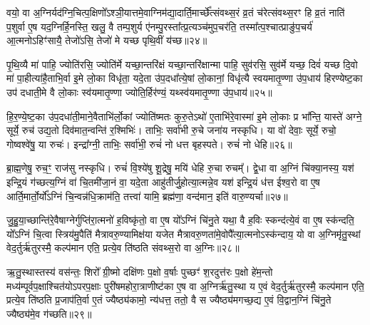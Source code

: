 {\anuvakamend[{तम॑सा\-ऽ\-ऽदि॒त्यो᳚\-ऽस्तीति॒ दिश॑ आदि॒त्यः प्र॒जाप॑तिमब्रवी॒दुप॑ त्वा॒\-ऽसौ पञ्च॑चत्वारिꣳशच्च॥६॥}]}

वयो॒ वा अ॒ग्निर्यद॑ग्नि॒चित्प॒क्षिणो᳚\-ऽश्ञी॒यात्तमे॒वाग्निम॑द्या॒दार्ति॒मार्च्छे᳚त्संवथ्स॒रं व्र॒तं च॑रेत्संवथ्स॒रꣳ हि व्र॒तं नाति॑ प॒शुर्वा ए॒ष यद॒ग्निर्\mbox{}हि॒नस्ति॒ खलु॒ वै तम्प॒शुर्य ए॑नम्पु॒रस्ता᳚त्प्र॒त्यञ्च॑मुप॒चर॑ति॒ तस्मा᳚त्प॒श्चात्प्राङु॑प॒चर्य॑ आ॒त्मनो\-ऽहिꣳ॑सायै॒ तेजो॑\-ऽसि॒ तेजो॑ मे यच्छ पृथि॒वीं य॑च्छ॥२४॥

पृ॒थि॒व्यै मा॑ पाहि॒ ज्योति॑रसि॒ ज्योति॑र्मे यच्छा॒न्तरि॑क्षं यच्छा॒न्तरि॑क्षान्मा पाहि॒ सुव॑रसि॒ सुव॑र्मे यच्छ॒ दिवं॑ यच्छ दि॒वो मा॑ पा॒हीत्या॑है॒ताभि॒र्वा इ॒मे लो॒का विधृ॑ता॒ यदे॒ता उ॑प॒दधा᳚त्ये॒षां लो॒कानां॒ विधृ॑त्यै स्वयमातृ॒ण्णा उ॑प॒धाय॑ हिरण्येष्ट॒का उप॑ दधाती॒मे वै लो॒काः स्व॑यमातृ॒ण्णा ज्योति॒र्\mbox{}हिर॑ण्यं॒ यथ्स्व॑यमातृ॒ण्णा उ॑प॒धाय॑॥२५॥

हि॒र॒ण्ये॒ष्ट॒का उ॑प॒दधा॑ती॒माने॒वैताभि॑र्लो॒कां ज्योति॑ष्मतः कुरु॒ते\-ऽथो॑ ए॒ताभि॑रे॒वास्मा॑ इ॒मे लो॒काः प्र भा᳚न्ति॒ यास्ते॑ अग्ने॒ सूर्ये॒ रुच॑ उद्य॒तो दिव॑मात॒न्वन्ति॑ र॒श्मिभिः॑। ताभिः॒ सर्वा॑भी रु॒चे जना॑य नस्कृधि। या वो॑ देवाः॒ सूर्ये॒ रुचो॒ गोष्वश्वे॑षु॒ या रुचः॑। इन्द्रा᳚ग्नी॒ ताभिः॒ सर्वा॑भी॒ रुचं॑ नो धत्त बृहस्पते। रुचं॑ नो धेहि॥२६॥

ब्रा॒ह्म॒णेषु॒ रुच॒ꣳ॒ राज॑सु नस्कृधि। रुचं॑ वि॒श्ये॑षु शू॒द्रेषु॒ मयि॑ धेहि रु॒चा रुचम्᳚। द्वे॒धा वा अ॒ग्निं चि॑क्या॒नस्य॒ यश॑ इन्द्रि॒यं ग॑च्छत्य॒ग्निं वा॑ चि॒तमी॑जा॒नं वा॒ यदे॒ता आहु॑तीर्जु॒होत्या॒त्मन्ने॒व यश॑ इन्द्रि॒यं ध॑त्त ईश्व॒रो वा ए॒ष आर्ति॒मार्तो॒र्यो᳚\-ऽग्निं चि॒न्वन्न॑धि॒क्राम॑ति॒ तत्त्वा॑ यामि॒ ब्रह्म॑णा॒ वन्द॑मान॒ इति॑ वारु॒ण्यर्चा॥२७॥

जु॒हु॒या॒च्छान्ति॑रे॒वैषाग्नेर्गुप्ति॑रा॒त्मनो॑ ह॒विष्कृ॑तो॒ वा ए॒ष यो᳚\-ऽग्निं चि॑नु॒ते यथा॒ वै ह॒विः स्कन्द॑त्ये॒वं वा ए॒ष स्क॑न्दति॒ यो᳚\-ऽग्निं चि॒त्वा स्त्रिय॑मु॒पैति॑ मैत्रावरु॒ण्यामिक्ष॑या यजेत मैत्रावरु॒णता॑मे॒वोपै᳚त्या॒त्मनो\-ऽस्क॑न्दाय॒ यो वा अ॒ग्निमृ॑तु॒स्थां वेद॒र्तुर्\mbox{}ऋ॑तुरस्मै॒ कल्प॑मान एति॒ प्रत्ये॒व ति॑ष्ठति संवथ्स॒रो वा अ॒ग्निः॥२८॥

ऋ॒तु॒स्थास्तस्य॑ वस॑न्तः॒ शिरो᳚ ग्री॒ष्मो दक्षि॑णः प॒क्षो व॒र्\mbox{}षाः पुच्छꣳ॑ श॒रदुत्त॑रः प॒क्षो हे॑म॒न्तो मध्य॑म्पूर्वप॒क्षाश्चित॑यो\-ऽपरप॒क्षाः पुरी॑षमहोरा॒त्राणीष्ट॑का ए॒ष वा अ॒ग्निर्\mbox{}ऋ॑तु॒स्था य ए॒वं वेद॒र्तुर्\mbox{}ऋ॑तुरस्मै॒ कल्प॑मान एति॒ प्रत्ये॒व ति॑ष्ठति प्र॒जाप॑ति॒र्वा ए॒तं ज्यैष्ठ्य॑कामो॒ न्य॑धत्त॒ ततो॒ वै स ज्यैष्ठ्य॑मगच्छ॒द्य ए॒वं वि॒द्वान॒ग्निं चि॑नु॒ते ज्यैष्ठ्य॑मे॒व ग॑च्छति॥२९॥

